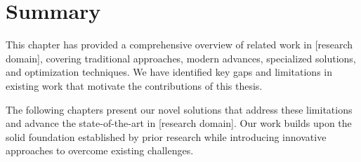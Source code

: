 \section{Summary}

This chapter has provided a comprehensive overview of related work in [research domain], covering traditional approaches, modern advances, specialized solutions, and optimization techniques. We have identified key gaps and limitations in existing work that motivate the contributions of this thesis.

The following chapters present our novel solutions that address these limitations and advance the state-of-the-art in [research domain]. Our work builds upon the solid foundation established by prior research while introducing innovative approaches to overcome existing challenges.




